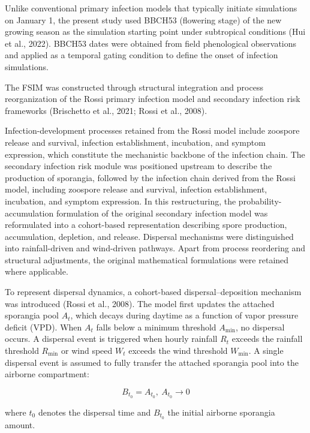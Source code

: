 \documentclass[
]{article}
\begin{document}
Unlike conventional primary infection models that typically initiate
simulations on January 1, the present study used BBCH53 (flowering
stage) of the new growing season as the simulation starting point under
subtropical conditions (Hui et al., 2022). BBCH53 dates were obtained
from field phenological observations and applied as a temporal gating
condition to define the onset of infection simulations.

The FSIM was constructed through structural integration and process
reorganization of the Rossi primary infection model and secondary
infection risk frameworks (Brischetto et al., 2021; Rossi et al., 2008).

Infection-development processes retained from the Rossi model include
zoospore release and survival, infection establishment, incubation, and
symptom expression, which constitute the mechanistic backbone of the
infection chain. The secondary infection risk module was positioned
upstream to describe the production of sporangia, followed by the
infection chain derived from the Rossi model, including zoospore release
and survival, infection establishment, incubation, and symptom
expression. In this restructuring, the probability-accumulation
formulation of the original secondary infection model was reformulated
into a cohort-based representation describing spore production,
accumulation, depletion, and release. Dispersal mechanisms were
distinguished into rainfall-driven and wind-driven pathways. Apart from
process reordering and structural adjustments, the original mathematical
formulations were retained where applicable.

To represent dispersal dynamics, a cohort-based dispersal--deposition
mechanism was introduced (Rossi et al., 2008). The model first updates
the attached sporangia pool \(A_{t}\), which decays during daytime as a
function of vapor pressure deficit (VPD). When \(A_{t}\) falls below a
minimum threshold \(A_{\min}\), no dispersal occurs. A dispersal event
is triggered when hourly rainfall \(R_{t}\) exceeds the rainfall
threshold \(R_{\min}\) or wind speed \(W_{t}\) exceeds the wind
threshold \(W_{\min}\). A single dispersal event is assumed to fully
transfer the attached sporangia pool into the airborne compartment:

\begin{equation}
B_{t_{0}} = A_{t_{0}},\ A_{t_{0}} \rightarrow 0
\tag{1}
\end{equation}

where \(t_{0}\) denotes the dispersal time and \(B_{t_{0}}\) the initial
airborne sporangia amount.
\end{document}
